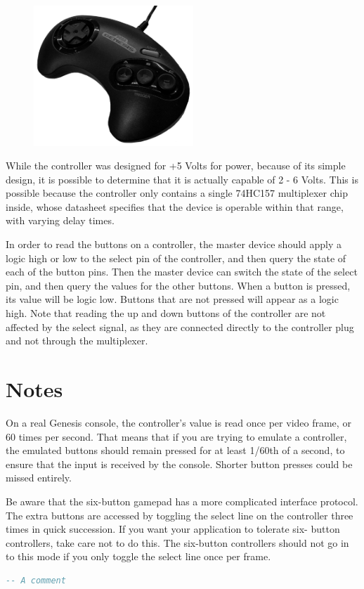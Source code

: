 \documentclass{capstonedoc}
\begin{document}
\begin{figure}[t]
  \centering
  \includegraphics[width=6cm]{genesis_controller}
\end{figure}

While the controller was designed for +5 Volts for power, because of its simple
design, it is possible to determine that it is actually capable of 2 - 6 Volts.
This is possible because the controller only contains a single 74HC157
multiplexer chip inside, whose datasheet specifies that the device is operable
within that range, with varying delay times.\cite{TC74HC157AP}

In order to read the buttons on a controller, the master device should apply
a logic high or low to the select pin of the controller, and then query the
state of each of the button pins. Then the master device can switch the state
of the select pin, and then query the values for the other buttons. When a
button is pressed, its value will be logic low. Buttons that are not pressed
will appear as a logic high. Note that reading the up and down buttons of
the controller are not affected by the select signal, as they are connected
directly to the controller plug and not through the multiplexer.

\section{Notes}
On a real Genesis console, the controller's value is read once per video frame,
or 60 times per second. That means that if you are trying to emulate a
controller, the emulated buttons should remain pressed for at least 1/60th of
a second, to ensure that the input is received by the console. Shorter button
presses could be missed entirely.

Be aware that the six-button gamepad has a more complicated interface protocol.
The extra buttons are accessed by toggling the select line on the controller
three times in quick succession. If you want your application to tolerate six-
button controllers, take care not to do this. The six-button controllers should
not go in to this mode if you only toggle the select line once per frame.

\begin{lstlisting}[language={vhdl},float]
-- A comment
\end{lstlisting}



\end{document}
